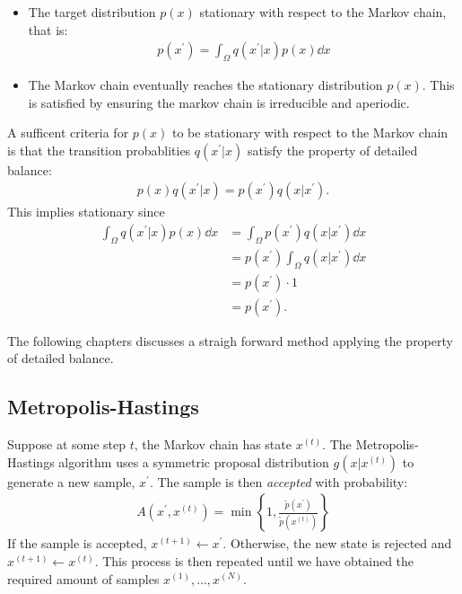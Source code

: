 \begin{itemize}
    \item The target distribution $p(x)$ stationary with respect to the Markov chain, that is:
    \begin{align} \label{eq:stationarity}
        p(x^\prime) = \int_{\Omega} q(x^\prime| x) p(x) \dd{x} 
    \end{align}
    \item The Markov chain eventually reaches the stationary distribution $p(x)$. This is satisfied by ensuring the markov chain is irreducible and aperiodic.

\end{itemize}
A sufficent criteria for $p(x)$ to be stationary with respect to the Markov chain is that the transition probablities $q(x^\prime|x)$ satisfy the property of detailed balance:
\begin{align*}
    p(x)q(x^\prime | x) = p(x^\prime)q(x| x^\prime).
\end{align*}
This implies stationary since
\begin{align*}
    \int_{\Omega} q(x^\prime | x) p(x) \dd{x} 
    &= \int_{\Omega}  p(x^\prime)q(x| x^\prime) \dd{x} \\ 
    &=  p(x^\prime) \int_{\Omega} q(x| x^\prime) \dd{x} \\
    &=  p(x^\prime) \cdot 1 \\
    &= p(x^\prime).
\end{align*}

The following chapters discusses a straigh forward method applying the property of detailed balance.

\subsection{Metropolis-Hastings}

Suppose at some step $t$, the Markov chain has state $x^{(t)}$. The Metropolis-Hastings algorithm uses a symmetric proposal distribution $g(x|x^{(t)})$ to generate a new sample, $x^\prime$. The sample is then \emph{accepted} with probability:
\begin{align*}
    A(x^{\prime}, x^{(t)}) = \min\left\{1, \frac{\tilde{p}(x^\prime)}{\tilde{p}(x^{(t)})}\right\}
\end{align*}
If the sample is accepted, $x^{(t+1)} \gets x^\prime$. Otherwise, the new state is rejected and $x^{(t+1)} \gets x^{(t)}$. This process is then repeated until we have obtained the required amount of samples $x^{(1)},\dots,x^{(N)}$. 


